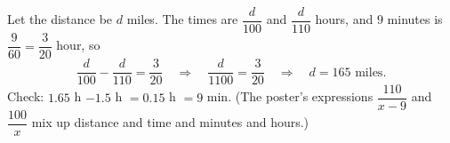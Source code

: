 Let the distance be $d$ miles. The times are $\dfrac{d}{100}$ and $\dfrac{d}{110}$ hours, and $9$ minutes is $\dfrac{9}{60}=\dfrac{3}{20}$ hour, so
\[
\dfrac{d}{100}-\dfrac{d}{110}=\dfrac{3}{20}\quad\Longrightarrow\quad\dfrac{d}{1100}=\dfrac{3}{20}\quad\Longrightarrow\quad d=\boxed{165\text{ miles}}.
\]
Check: $1.65$ h $-1.5$ h $=0.15$ h $=9$ min. (The poster's expressions $\dfrac{110}{x-9}$ and $\dfrac{100}{x}$ mix up distance and time and minutes and hours.)
